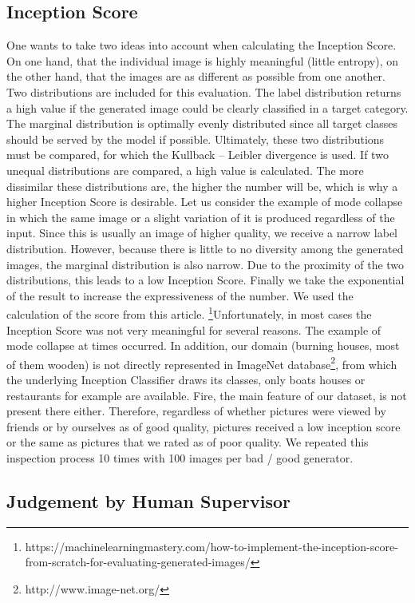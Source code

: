     \subsection{Inception Score}
    One wants to take two ideas into account when calculating the Inception Score. On one hand, that the individual image is highly meaningful (little entropy), on the other hand, that the images are as different as possible from one another. Two distributions are included for this evaluation. The label distribution returns a high value if the generated image could be clearly classified in a target category. The marginal distribution is optimally evenly distributed since all target classes should be served by the model if possible. Ultimately, these two distributions must be compared, for which the Kullback – Leibler divergence is used. If two unequal distributions are compared, a high value is calculated. The more dissimilar these distributions are, the higher the number will be, which is why a higher Inception Score is desirable. Let us consider the example of mode collapse in which the same image or a slight variation of it is produced regardless of the input. Since this is usually an image of higher quality, we receive a narrow label distribution. However, because there is little to no diversity among the generated images, the marginal distribution is also narrow. Due to the proximity of the two distributions, this leads to a low Inception Score. Finally we take the exponential of the result to increase the expressiveness of the number. We used the calculation of the score from this article. \footnote{https://machinelearningmastery.com/how-to-implement-the-inception-score-from-scratch-for-evaluating-generated-images/}Unfortunately, in most cases the Inception Score was not very meaningful for several reasons. The example of mode collapse at times occurred. In addition, our domain (burning houses, most of them wooden) is not directly represented in ImageNet database\footnote{http://www.image-net.org/}, from which the underlying Inception Classifier draws its classes, only boats houses or restaurants for example are available. Fire, the main feature of our dataset, is not present there either. Therefore, regardless of whether pictures were viewed by friends or by ourselves as of good quality, pictures received a low inception score or the same as pictures that we rated as of poor quality. We repeated this inspection process 10 times with 100 images per bad / good generator.

    \subsection{Judgement by Human Supervisor}


